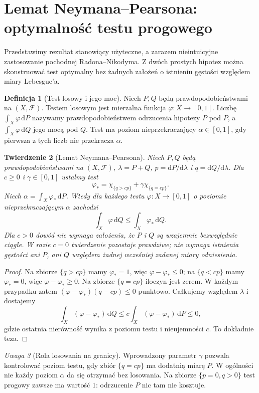 \documentclass[11pt,a4paper,oneside]{book}
\numberwithin{equation}{chapter}
\theoremstyle{plain}
\newtheorem{twierdzenie}{Twierdzenie}[chapter]
\theoremstyle{definition}
\newtheorem{definicja}[twierdzenie]{Definicja}
\theoremstyle{remark}
\newtheorem{uwaga}[twierdzenie]{Uwaga}
\begin{document}
\section{Lemat Neymana--Pearsona: optymalność testu progowego}
Przedstawimy rezultat stanowiący użyteczne, a zarazem nieintuicyjne
zastosowanie pochodnej Radona--Nikodyma. Z dwóch prostych hipotez
można skonstruować test optymalny bez żadnych założeń o istnieniu
gęstości względem miary Lebesgue'a.

\begin{definicja}[Test losowy i jego moc]
\label{def:test-19}
Niech $P,Q$ będą prawdopodobieństwami na $(X,\mathcal F)$.
Testem losowym jest mierzalna funkcja $\varphi:X\to[0,1]$.
Liczbę $\int_X\varphi\,\mathrm dP$ nazywamy
prawdopodobieństwem odrzucenia hipotezy $P$ pod $P$,
a $\int_X\varphi\,\mathrm dQ$ jego mocą pod $Q$.
Test ma poziom nieprzekraczający $\alpha\in[0,1]$,
gdy pierwsza z tych liczb nie przekracza $\alpha$.
\end{definicja}

\begin{twierdzenie}[Lemat Neymana--Pearsona]
\label{thm:neyman-pearson-19}
Niech $P,Q$ będą prawdopodobieństwami na $(X,\mathcal F)$,
$\lambda=P+Q$, $p=\mathrm dP/\mathrm d\lambda$
i $q=\mathrm dQ/\mathrm d\lambda$.
Dla $c\ge0$ i $\gamma\in[0,1]$ ustalmy test
\[
\varphi_*=\chi_{\{q>cp\}}+
 \gamma\chi_{\{q=cp\}}.
\]
Niech $\alpha=\int_X\varphi_*\,\mathrm dP$.
Wtedy dla każdego testu $\varphi:X\to[0,1]$ o poziomie
nieprzekraczającym $\alpha$ zachodzi
\[
 \int_X\varphi\,\mathrm dQ\le
 \int_X\varphi_*\,\mathrm dQ.
\]
Dla $c>0$ dowód nie wymaga założenia, że
$P$ i $Q$ są wzajemnie bezwzględnie ciągłe.
W razie $c=0$ twierdzenie pozostaje prawdziwe;
nie wymaga istnienia gęstości ani $P$, ani $Q$ względem
żadnej wcześniej zadanej miary odniesienia.
\end{twierdzenie}
\begin{proof}
Na zbiorze $\{q>cp\}$ mamy $\varphi_*=1$, więc
$\varphi-\varphi_*\le0$; na $\{q<cp\}$ mamy
$\varphi_*=0$, więc $\varphi-\varphi_*\ge0$.
Na zbiorze $\{q=cp\}$ iloczyn jest zerem. W każdym
przypadku zatem
$(\varphi-\varphi_*)(q-cp)\le0$ punktowo.
Całkujemy względem $\lambda$ i dostajemy
\[
\int_X(\varphi-\varphi_*)\,\mathrm dQ
\le c\int_X(\varphi-\varphi_*)\,\mathrm dP\le0,
\]
gdzie ostatnia nierówność wynika z poziomu testu
i nieujemności $c$. To dokładnie teza.
\end{proof}

\begin{uwaga}[Rola losowania na granicy]
Wprowadzony parametr $\gamma$ pozwala kontrolować poziom
testu, gdy zbiór $\{q=cp\}$ ma dodatnią miarę $P$.
W ogólności nie każdy poziom $\alpha$ da się otrzymać
bez losowania. Na zbiorze $\{p=0,q>0\}$ test progowy
zawsze ma wartość $1$: odrzucenie $P$ nic tam nie kosztuje.
\end{uwaga}
\end{document}
